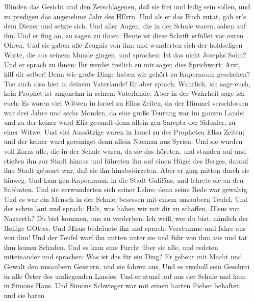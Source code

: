 Blinden das Gesicht und den Zerschlagenen, daß sie frei und ledig sein
sollen,  und zu predigen das angenehme Jahr des HErrn.
 Und als er das Buch zutat, gab er's dem Diener und setzte
sich. Und aller Augen, die in der Schule waren, sahen auf ihn.
 Und er fing an, zu sagen zu ihnen: Heute ist diese Schrift
erfüllet vor euren Ohren.  Und sie gaben alle Zeugnis von
ihm und wunderten sich der holdseligen Worte, die aus seinem Munde
gingen, und sprachen: Ist das nicht Josephs Sohn?  Und er
sprach zu ihnen: Ihr werdet freilich zu mir sagen dies Sprichwort: Arzt,
hilf dir selber! Denn wie große Dinge haben wir gehört zu Kapernaum
geschehen? Tue auch also hier in deinem Vaterlande!  Er
aber sprach: Wahrlich, ich sage euch, kein Prophet ist angenehm in
seinem Vaterlande.  Aber in der Wahrheit sage ich euch: Es
waren viel Witwen in Israel zu Elias Zeiten, da der Himmel verschlossen
war drei Jahre und sechs Monden, da eine große Teurung war im ganzen
Lande;  und zu der keiner ward Elia gesandt denn allein gen
Sarepta der Sidonier, zu einer Witwe.  Und viel Aussätzige
waren in Israel zu des Propheten Elisa Zeiten; und der keiner ward
gereiniget denn allein Naeman aus Syrien.  Und sie wurden
voll Zorns alle, die in der Schule waren, da sie das höreten,
 und stunden auf und stießen ihn zur Stadt hinaus und
führeten ihn auf einen Hügel des Berges, darauf ihre Stadt gebauet war,
daß sie ihn hinabstürzeten.  Aber er ging mitten durch sie
hinweg.  Und kam gen Kapernaum, in die Stadt Galiläas, und
lehrete sie an den Sabbaten.  Und sie verwunderten sich
seiner Lehre; denn seine Rede war gewaltig.  Und es war ein
Mensch in der Schule, besessen mit einem unsaubern Teufel. Und der
schrie laut  und sprach: Halt, was haben wir mit dir zu
schaffen, JEsus von Nazareth? Du bist kommen, uns zu verderben. Ich
weiß, wer du bist, nämlich der Heilige GOttes.  Und JEsus
bedräuete ihn und sprach: Verstumme und fahre aus von ihm! Und der
Teufel warf ihn mitten unter sie und fuhr von ihm aus und tat ihm keinen
Schaden.  Und es kam eine Furcht über sie alle, und redeten
miteinander und sprachen: Was ist das für ein Ding? Er gebeut mit Macht
und Gewalt den unsaubern Geistern, und sie fahren aus.  Und
es erscholl sein Geschrei in alle Örter des umliegenden Landes.
 Und er stund auf aus der Schule und kam in Simons Haus.
Und Simons Schwieger war mit einem harten Fieber behaftet; und sie baten
